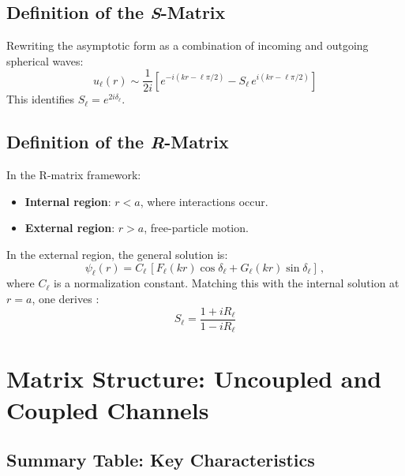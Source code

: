 \documentclass[10pt,a4paper]{article}
\begin{document}
	\subsection{Definition of the \textit{S}-Matrix}
	
	Rewriting the asymptotic form as a combination of incoming and outgoing spherical waves:
	\[
	u_\ell(r) \sim \frac{1}{2i} \left[ e^{-i(kr - \ell\pi/2)} - S_\ell \, e^{i(kr - \ell\pi/2)} \right]
	\]
	This identifies \( S_\ell = e^{2i\delta_\ell} \).
	
	\subsection{Definition of the \textit{R}-Matrix}
	
	In the R-matrix framework:
	\begin{itemize}
		\item \textbf{Internal region}: \( r < a \), where interactions occur.
		\item \textbf{External region}: \( r > a \), free-particle motion.
	\end{itemize}
	
	In the external region, the general solution is:
	\begin{equation}
		\psi_\ell(r) = C_\ell\, \left[ F_\ell(kr) \cos\delta_\ell + G_\ell(kr) \sin\delta_\ell \right]\,,
		\label{eq:asymptotic_u}
	\end{equation}
	where $C_\ell$ is a normalization constant.
	Matching this with the internal solution at \( r = a \), one derives \cite{advances}:
	\begin{equation}
		S_\ell = \frac{1 + iR_\ell}{1 - iR_\ell}
	\end{equation}
	
	\section{Matrix Structure: Uncoupled and Coupled Channels}
	
	\subsection{Summary Table: Key Characteristics}
	
\end{document}
